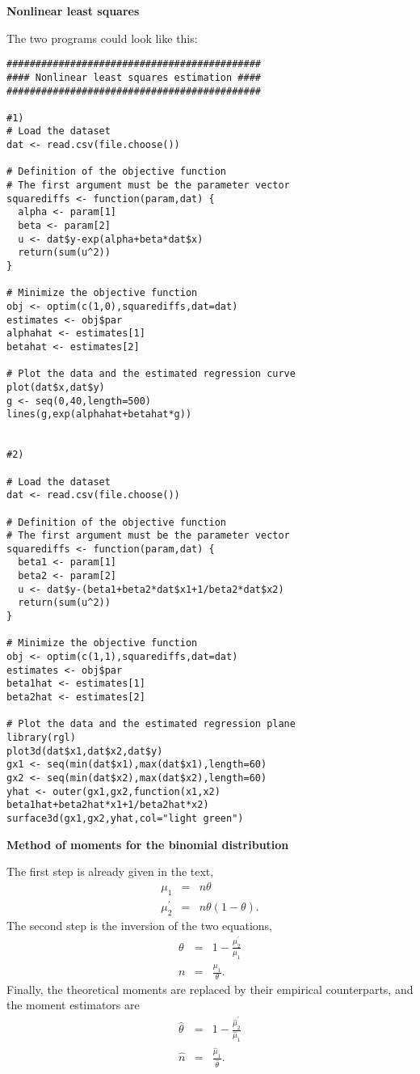 \begin{Solution}{11.1}
\textbf{Nonlinear least squares}

\item The two programs could look like this:

\begin{verbatim}
############################################
#### Nonlinear least squares estimation ####
############################################

#1)
# Load the dataset
dat <- read.csv(file.choose())

# Definition of the objective function
# The first argument must be the parameter vector
squarediffs <- function(param,dat) {
  alpha <- param[1]
  beta <- param[2]
  u <- dat$y-exp(alpha+beta*dat$x)
  return(sum(u^2))
}

# Minimize the objective function
obj <- optim(c(1,0),squarediffs,dat=dat)
estimates <- obj$par
alphahat <- estimates[1]
betahat <- estimates[2]

# Plot the data and the estimated regression curve
plot(dat$x,dat$y)
g <- seq(0,40,length=500)
lines(g,exp(alphahat+betahat*g))


#2)

# Load the dataset
dat <- read.csv(file.choose())

# Definition of the objective function
# The first argument must be the parameter vector
squarediffs <- function(param,dat) {
  beta1 <- param[1]
  beta2 <- param[2]
  u <- dat$y-(beta1+beta2*dat$x1+1/beta2*dat$x2)
  return(sum(u^2))
}

# Minimize the objective function
obj <- optim(c(1,1),squarediffs,dat=dat)
estimates <- obj$par
beta1hat <- estimates[1]
beta2hat <- estimates[2]

# Plot the data and the estimated regression plane
library(rgl)
plot3d(dat$x1,dat$x2,dat$y)
gx1 <- seq(min(dat$x1),max(dat$x1),length=60)
gx2 <- seq(min(dat$x2),max(dat$x2),length=60)
yhat <- outer(gx1,gx2,function(x1,x2) beta1hat+beta2hat*x1+1/beta2hat*x2)
surface3d(gx1,gx2,yhat,col="light green")
\end{verbatim}
\end{Solution}
\begin{Solution}{11.2}
\textbf{Method of moments for the binomial distribution}

The first step is already given in the text,%
\begin{eqnarray*}
\mu _{1} &=&n\theta  \\
\mu _{2}^{\prime } &=&n\theta \left( 1-\theta \right) .
\end{eqnarray*}%
The second step is the inversion of the two equations,%
\begin{eqnarray*}
\theta  &=&1-\frac{\mu _{2}^{\prime }}{\mu _{1}} \\
n &=&\frac{\mu _{1}}{\theta }.
\end{eqnarray*}%
Finally, the theoretical moments are replaced by their empirical
counterparts, and the moment estimators are%
\begin{eqnarray*}
\hat{\theta} &=&1-\frac{\hat{\mu}_{2}^{\prime }}{\hat{\mu}_{1}} \\
\hat{n} &=&\frac{\hat{\mu}_{1}}{\hat{\theta}}.
\end{eqnarray*}
\end{Solution}
